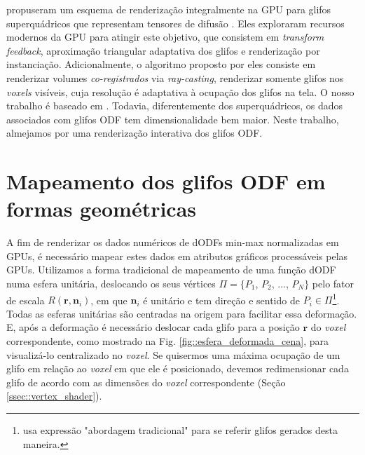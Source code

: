  propuseram um esquema de renderização integralmente na GPU para glifos superquádricos que representam tensores de difusão \cite{Kindlmann2004}. Eles exploraram recursos modernos da GPU para atingir este objetivo, que consistem em \textit{transform feedback}, aproximação triangular adaptativa dos glifos e renderização por instanciação. Adicionalmente, o algoritmo proposto por eles consiste em renderizar volumes \textit{co-registrados} via \textit{ray-casting}, renderizar somente glifos nos \textit{voxels} visíveis, cuja resolução 
é adaptativa à ocupação dos glifos na tela. O nosso trabalho é baseado em . Todavia, diferentemente dos superquádricos, os dados associados com glifos ODF tem dimensionalidade bem maior. Neste trabalho, almejamos por uma renderização interativa dos glifos ODF.

\section{Mapeamento dos glifos ODF em formas geométricas}
\label{sec::renderizacao_de_glifos_ODF}


A fim de renderizar os dados numéricos de dODFs min-max normalizadas em GPUs, é necessário mapear estes dados em atributos gráficos processáveis pelas GPUs. Utilizamos a forma tradicional de mapeamento de uma função dODF numa esfera unitária, deslocando os seus vértices $\Pi = \{
P_1$,
$P_2$, ...,
$P_N
\}$
pelo fator de escala $R(\mathbf{r}, \mathbf{n}_i)$, em que $\mathbf{n}_i$ é unitário e tem direção e sentido de $P_i \in \Pi$\footnote{ usa expressão "abordagem tradicional" para se referir glifos gerados desta maneira.}. Todas as esferas unitárias são centradas na origem para facilitar essa deformação. E, após a deformação é necessário deslocar cada glifo para a posição $\mathbf{r}$ do \textit{voxel} correspondente, como mostrado na Fig. \ref{fig::esfera_deformada_cena}, para visualizá-lo centralizado no \textit{voxel}. Se quisermos uma máxima ocupação de um glifo em relação ao \textit{voxel} em que ele é posicionado, devemos redimensionar cada glifo de acordo com as dimensões do \textit{voxel} correspondente (Seção \ref{ssec::vertex_shader}).

